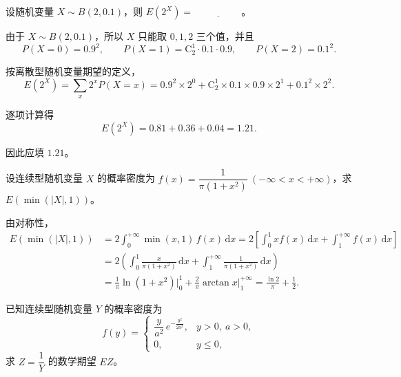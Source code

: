 ﻿\documentclass[lang=cn,11pt]{elegantbook}
\begin{document}
\begin{exercise}\label{exer:4-1-2x}
设随机变量 \(X \sim B(2, 0.1)\)，则 \(E(2^X) =\,\underline{\hspace{2cm}}\)。
\end{exercise}

\begin{solution}
由于 \(X\sim B(2,0.1)\)，所以 \(X\) 只能取 \(0,1,2\) 三个值，并且
\[
P(X=0)=0.9^2,\qquad
P(X=1)=\mathrm{C}_2^1\cdot 0.1\cdot 0.9,\qquad
P(X=2)=0.1^2.
\]

按离散型随机变量期望的定义，
\[
E(2^X)
=\sum_x 2^xP(X=x)
=0.9^2 \times 2^0+\mathrm{C}_2^1 \times 0.1 \times 0.9 \times 2^1+0.1^2 \times 2^2.
\]

逐项计算得
\[
E(2^X)=0.81+0.36+0.04=1.21.
\]

因此应填 \(1.21\)。
\end{solution}

\begin{exercise}\label{exer:4-s14-cauchymin}
设连续型随机变量 \(X\) 的概率密度为 \(f(x) = \dfrac{1}{\pi(1+x^2)}\ (-\infty < x < +\infty)\)，求 \(E(\min(|X|,1))\)。
\end{exercise}

\begin{solution}
由对称性，
\[
\begin{aligned}
E(\min(|X|,1)) &= 2\int_0^{+\infty}\min(x,1)\,f(x)\,\mathrm{d}x = 2\left[\int_0^1 x f(x)\,\mathrm{d}x + \int_1^{+\infty} f(x)\,\mathrm{d}x\right] \\
&= 2\left(\int_0^1 \frac{x}{\pi(1+x^2)}\,\mathrm{d}x + \int_1^{+\infty}\frac{1}{\pi(1+x^2)}\,\mathrm{d}x\right) \\
&= \frac{1}{\pi}\ln(1+x^2)\Big|_0^1 + \frac{2}{\pi}\arctan x\Big|_1^{+\infty} = \frac{\ln 2}{\pi} + \frac{1}{2}.
\end{aligned}
\]
\end{solution}

\begin{exercise}\label{exer:4-s7-rayleigh}
已知连续型随机变量 \(Y\) 的概率密度为
\[
f(y) = \begin{cases} \dfrac{y}{a^2}\,e^{-\frac{y^2}{2a^2}}, & y > 0,\ a > 0, \\[4pt] 0, & y \leqslant 0, \end{cases}
\]
求 \(Z = \dfrac{1}{Y}\) 的数学期望 \(EZ\)。
\end{exercise}
\end{document}
